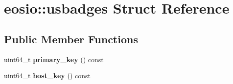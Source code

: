 \hypertarget{structeosio_1_1usbadges}{}\section{eosio\+:\+:usbadges Struct Reference}
\label{structeosio_1_1usbadges}
\subsection*{Public Member Functions}
\begin{DoxyCompactItemize}
\item 
\mbox{\label{structeosio_1_1usbadges_a82542c6ea2cacdc6249264787e6086ec}} 
uint64\+\_\+t {\bfseries primary\+\_\+key} () const
\item 
\mbox{\label{structeosio_1_1usbadges_ab26c4b6cc771bfe7bc0f6b9a242c1e57}} 
uint64\+\_\+t {\bfseries host\+\_\+key} () const
\end{DoxyCompactItemize}
